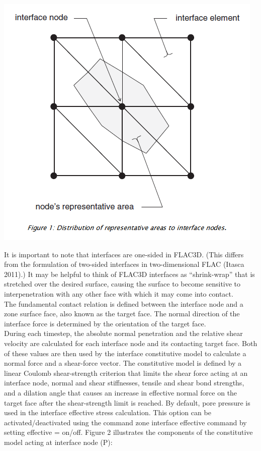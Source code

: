 \documentclass[a4paper, nobind]{templates/ociamthesis}
\begin{document}
\includegraphics[width=1\linewidth]{myfigureeeeee/interface-formulation}

It is important to note that interfaces are one-sided in FLAC3D. (This differs from the formulation of two-sided interfaces in two-dimensional FLAC (Itasca 2011).) It may be helpful to think of FLAC3D interfaces as ``shrink-wrap'' that is stretched over the desired surface, causing the surface to become sensitive to interpenetration with any other face with which it may come into contact.\\

The fundamental contact relation is defined between the interface node and a zone surface face, also known as the target face. The normal direction of the interface force is determined by the orientation of the target face.\\

During each timestep, the absolute normal penetration and the relative shear velocity are calculated for each interface node and its contacting target face. Both of these values are then used by the interface constitutive model to calculate a normal force and a shear-force vector. The constitutive model is defined by a linear Coulomb shear-strength criterion that limits the shear force acting at an interface node, normal and shear stiffnesses, tensile and shear bond strengths, and a dilation angle that causes an increase in effective normal force on the target face after the shear-strength limit is reached. By default, pore pressure is used in the interface effective stress calculation. This option can be activated/deactivated using the command zone interface effective command by setting effective = on/off. Figure 2 illustrates the components of the constitutive model acting at interface node (P):\\
\end{document}
